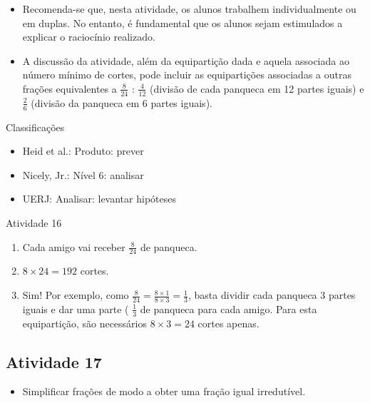 \begin{multicols}{2}
 
\begin{itemize} %
    \item       Recomenda-se que, nesta atividade, os alunos trabalhem 
individualmente ou em duplas. No entanto, é fundamental que os alunos sejam 
estimulados a explicar o raciocínio realizado.
    \item       A discussão da atividade, além da equipartição dada e aquela 
associada ao número mínimo de cortes, pode incluir as equipartições associadas a 
outras frações equivalentes a       $\frac{8}{24}$      :       $\frac{4}{12}$   
    (divisão de cada panqueca em 12 partes iguais) e       $\frac{2}{6}$       
(divisão da panqueca em 6 partes iguais).
\end{itemize} %
  
  
  Classificações  
\begin{itemize} %
    \item       Heid et al.: Produto: prever
    \item       Nicely, Jr.: Nível 6: analisar
    \item       UERJ: Analisar: levantar hipóteses
\end{itemize} %
  

\begin{resposta*}{Atividade 16}
\begin{enumerate} [\quad a)] %
    \item       Cada amigo vai receber       $\frac{8}{24}$       de panqueca.
    \item             $8 \times 24 = 192$       cortes.
    \item       Sim! Por exemplo, como       $\frac{8}{24} = \frac{8 \times 1}{8 
\times 3} = \frac{1}{3}$, basta dividir cada panqueca       $3$       partes 
iguais e dar uma parte (      $\frac{1}{3}$       de panqueca para cada amigo. 
Para esta equipartição, são necessários       $8 \times 3 = 24$       cortes 
apenas.
\end{enumerate} %
  
\end{resposta*}



\subsection{Atividade 17}

\begin{itemize} %
    \item       Simplificar frações de modo a obter uma fração igual 
irredutível.
\end{itemize} %
  

\end{multicols}
